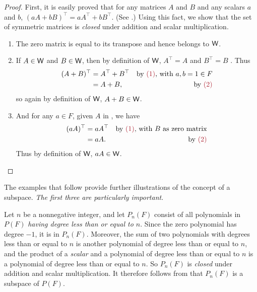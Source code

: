 \begin{proof}
First, it is easily proved that for any matrices \(A\) and \(B\) and any scalars \(a\) and \(b\), \((aA + bB)^\top = aA^\top + bB^\top\).  (See .)
Using this fact, we show that the set of symmetric matrices is \emph{closed} under addition and scalar multiplication.

\begin{enumerate}
    \item The zero matrix is equal to its transpose and hence belongs to \(\textsf{W}\).
    \item If \(A \in \textsf{W}\) and \(B \in \textsf{W}\), then by definition of \(\textsf{W}\), \(A^\top = A\) and \(B^\top = B\) .
          Thus
          \begin{align*}
              (A + B)^\top & = A^\top + B^\top & \text{by \MAROON{(1)}, with \(a, b = 1 \in F\)} \\
                        & = A + B, & \text{by \MAROON{(2)}}
          \end{align*}
          so again by definition of \(\textsf{W}\), \(A + B \in \textsf{W}\).
    \item And for any \(a \in F\), given \(A\) in , we have
        \begin{align*}
            (aA)^\top & = aA^\top & \text{by \MAROON{(1)}, with \(B\) as zero matrix} \\
                   & = aA. & \text{by \MAROON{(2)}}
        \end{align*}
        Thus by definition of \(\textsf{W}\), \(aA \in \textsf{W}\).
\end{enumerate}
\end{proof}

\begin{note}
The examples that follow provide further illustrations of the concept of a subspace. \emph{The first three are particularly important}.
\end{note}

\begin{example} \label{example 1.3.1}
Let \(n\) be a nonnegative integer, and let \(P_n(F)\) consist of all polynomials in \(P(F)\) \emph{having degree less than or equal to \(n\)}.
Since the zero polynomial has degree \(-1\), it is in \(P_n(F)\).
Moreover, the sum of two polynomials with degrees less than or equal to \(n\) is another polynomial of degree less than or equal to \(n\), and the product of a \emph{scalar} and a polynomial of degree less than or equal to \(n\) is a polynomial of degree less than or equal to \(n\).
So \(P_n(F)\) is \emph{closed} under addition and scalar multiplication.
It therefore follows from  that \(P_n(F)\) is a subspace of \(P(F)\).
\end{example}

